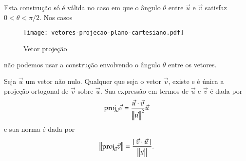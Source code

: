Esta constru\c{c}\~ao s\'o \'e v\'alida no caso em que o \^angulo $\theta$ entre $\vec{u}$ e $\vec{v}$ satisfaz $0 < \theta < \pi/2$. Nos casos
\begin{figure}
  \centering
  \caption{Vetor proje\c{c}\~ao}
  \texttt{[image: vetores-projecao-plano-cartesiano.pdf]}



      

\end{figure}
n\~ao podemos usar a constru\c{c}\~ao envolvendo o \^angulo $\theta$ entre os vetores.
\begin{proposicao}
  Seja $\vec{u}$ um vetor n\~ao nulo. Qualquer que seja o vetor $\vec{v}$, existe e \'e \'unica a proje\c{c}\~ao ortogonal de $\vec{v}$ sobre $\vec{u}$. Sua express\~ao em termos de $\vec{u}$ e $\vec{v}$ \'e dada por
  \[
    {\rm proj}_{\vec{u}}\vec{v} = \dfrac{\vec{u}\cdot\vec{v}}{\left\Vert{\vec{u}}\right\Vert^2}\vec{u}
  \]
  e sua norma \'e dada por
  \[
    \left\Vert{{\rm proj}_{\vec{u}}\vec{v}}\right\Vert = \dfrac{\mid\vec{v}\cdot\vec{u}\mid}{\left\Vert{\vec{u}}\right\Vert}.
  \]
\end{proposicao}
